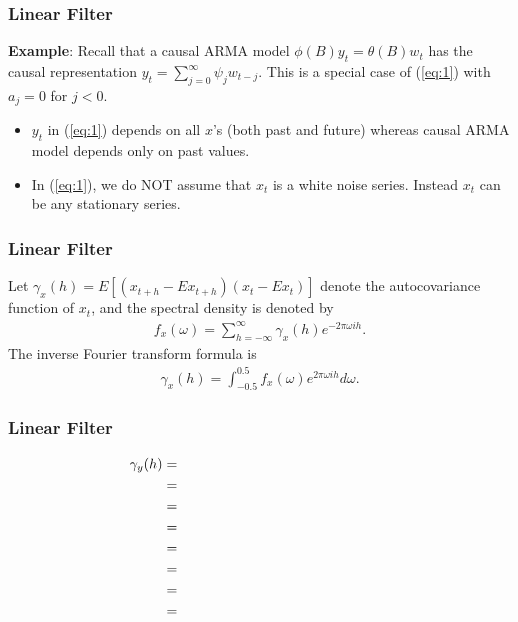 \documentclass[%
xcolor=pdftex]{beamer}
\begin{document}
\begin{frame}
\frametitle{Linear Filter}

\textbf{Example}: Recall that a causal ARMA model
$\phi(B)y_t =\theta(B)w_t$ has the causal representation
$y_t=\sum^\infty_{j=0}\psi_j w_{t-j}$. This is a special case
of (\ref{eq:1}) with $a_j=0$ for $j<0$. 

\begin{itemize}

\item $y_t$ in
(\ref{eq:1}) depends on all $x$'s (both past and future)
whereas causal ARMA model depends only on past values. 

\item In (\ref{eq:1}), we do NOT assume that $x_t$ is a white noise
series. Instead $x_t$ can be any stationary series.

\end{itemize}

\end{frame}

\begin{frame}
\frametitle{Linear Filter}

Let $\gamma_x(h)=E[(x_{t+h}-Ex_{t+h})(x_t-Ex_t)]$ denote the
autocovariance function of $x_t$, and the spectral density is denoted by
\begin{eqnarray*}
 f_x(\omega) = \sum^\infty_{h=-\infty} \gamma_x(h)e^{-2\pi \omega i h}.
 \end{eqnarray*}
The inverse Fourier transform formula is
\begin{eqnarray*}
 \gamma_x(h) = \int^{0.5}_{-0.5} f_x(\omega) e^{2\pi \omega i h} d\omega.
 \end{eqnarray*}

\end{frame}

\begin{frame}
\frametitle{Linear Filter}

\begin{eqnarray} \label{eq:3}
\gamma_y(h) &=& \hspace{50mm} \nonumber \\
            &=& \hspace{50mm} \nonumber \\
            &=& \hspace{50mm} \nonumber \\
            &=& \hspace{50mm} \nonumber \\
            &=& \hspace{50mm} \nonumber \\
            &=& \hspace{50mm} \nonumber \\
            &=& \hspace{50mm} \nonumber \\
            &=& \hspace{50mm}
\end{eqnarray}

\end{frame}
\end{document}
